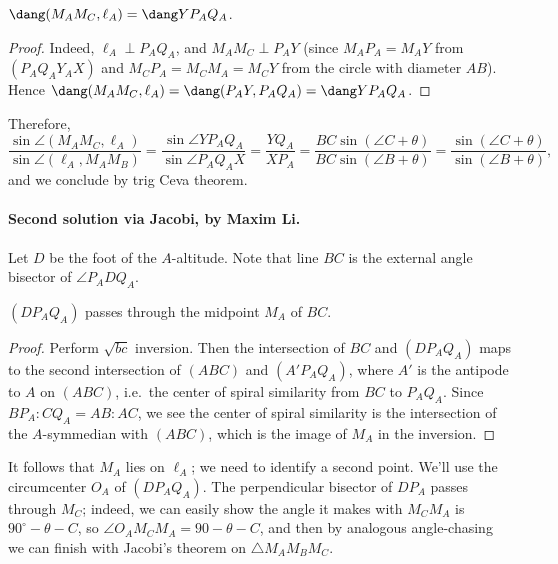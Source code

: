 \begin{claim*}
  $\dang (M_AM_C, \ell_A) = \dang YP_AQ_A$.
\end{claim*}
\begin{proof}
  Indeed, $\ell_A \perp P_AQ_A$, and $M_AM_C \perp P_AY$
  (since $M_AP_A = M_AY$ from $(P_AQ_AY_AX)$
  and $M_CP_A = M_CM_A = M_CY$ from the circle with diameter $AB$).
  Hence $\dang (M_AM_C, \ell_A) = \dang (P_AY, P_AQ_A) = \dang YP_AQ_A$.
\end{proof}
Therefore,
\[
  \frac{\sin \angle (M_AM_C, \ell_A)}{\sin \angle (\ell_A, M_AM_B)}
  = \frac{\sin \angle YP_AQ_A}{\sin \angle P_AQ_AX}
  = \frac{YQ_A}{XP_A}
  = \frac{BC \sin (\angle C+ \theta) }{BC \sin (\angle B+ \theta)}
  = \frac{\sin (\angle C+ \theta)}{\sin (\angle B+ \theta)},
\]
and we conclude by trig Ceva theorem.

\paragraph{Second solution via Jacobi, by Maxim Li.}
Let $D$ be the foot of the $A$-altitude.
Note that line $BC$ is the external angle bisector of $\angle P_ADQ_A$.
\begin{claim*}
  $(DP_AQ_A)$ passes through the midpoint $M_A$ of $BC$.
\end{claim*}
\begin{proof}
  Perform $\sqrt{bc}$ inversion.
  Then the intersection of $BC$ and $(DP_AQ_A)$
  maps to the second intersection of $(ABC)$ and $(A'P_AQ_A)$,
  where $A'$ is the antipode to $A$ on $(ABC)$,
  i.e.\ the center of spiral similarity from $BC$ to $P_AQ_A$.
  Since $BP_A:CQ_A = AB:AC$, we see the center of spiral similarity
  is the intersection of the $A$-symmedian with $(ABC)$,
  which is the image of $M_A$ in the inversion.
\end{proof}

It follows that $M_A$ lies on $\ell_A$;
we need to identify a second point.
We'll use the circumcenter $O_A$ of $(DP_AQ_A)$.
The perpendicular bisector of $DP_A$ passes through $M_C$;
indeed, we can easily show the angle it makes with $M_CM_A$
is $90^\circ - \theta - C$, so $\angle O_AM_CM_A = 90 - \theta - C$,
and then by analogous angle-chasing
we can finish with Jacobi's theorem on $\triangle M_AM_BM_C$.
